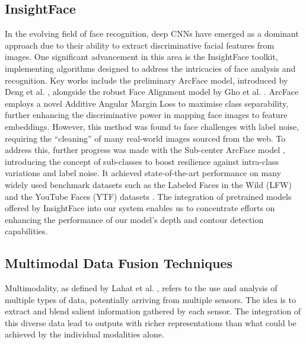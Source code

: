 \documentclass{mpaper}
\begin{document}
\subsection{InsightFace}
\label{background:insightface}
In the evolving field of face recognition, deep CNNs have emerged as a dominant approach due to their ability to extract discriminative facial features from images. One significant advancement in this area is the InsightFace toolkit, implementing algorithms designed to address the intricacies of face analysis and recognition. Key works include the preliminary ArcFace model, introduced by Deng et al. \cite{deng2018arcface}, alongside the robust Face Alignment model by Gho et al. \cite{guo2018stacked}. ArcFace employs a novel Additive Angular Margin Loss to maximise class separability, further enhancing the discriminative power in mapping face images to feature embeddings. However, this method was found to face challenges with label noise, requiring the ``cleaning'' of many real-world images sourced from the web. To address this, further progress was made with the Sub-center ArcFace model \cite{deng2020subcenter}, introducing the concept of sub-classes to boost resilience against intra-class variations and label noise. It achieved state-of-the-art performance on many widely used benchmark datasets such as the Labeled Faces in the Wild (LFW) \cite{huang2008labeled} and the YouTube Faces (YTF) datasets \cite{wolf2011face}. The integration of pretrained models offered by InsightFace into our system enables us to concentrate efforts on enhancing the performance of our model's depth and contour detection capabilities. 


\subsection{Multimodal Data Fusion Techniques}
Multimodality, as defined by Lahat et al. \cite{lahat2015multimodal}, refers to the use and analysis of multiple types of data, potentially arriving from multiple sensors. The idea is to extract and blend salient information gathered by each sensor. The integration of this diverse data lead to outputs with richer representations than what could be achieved by the individual modalities alone. 
\end{document}

